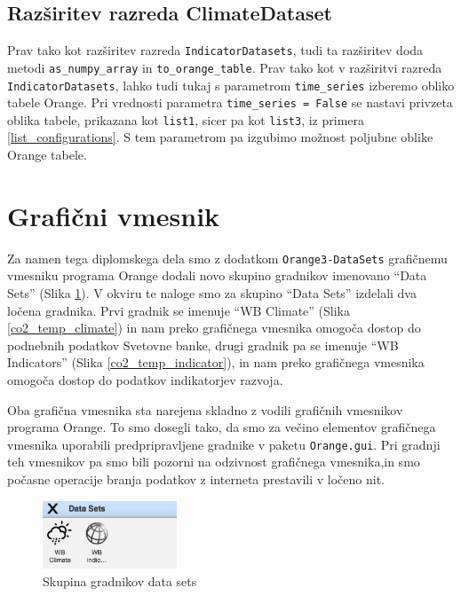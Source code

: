 \subsection{Razširitev razreda ClimateDataset}
\label{razsiritev_razreda_climatedataset}

Prav tako kot razširitev razreda \verb|IndicatorDatasets|, tudi ta razširitev
doda metodi \verb|as_numpy_array| in \verb|to_orange_table|. Prav tako kot v
razširitvi razreda \verb|IndicatorDatasets|, lahko tudi tukaj s parametrom
\verb|time_series| izberemo obliko tabele Orange. Pri vrednosti parametra 
\verb|time_series = False| se nastavi privzeta oblika tabele, prikazana kot
\verb|list1|, sicer pa kot \verb|list3|, iz primera \ref{list_configurations}.
S tem parametrom pa izgubimo možnost poljubne oblike Orange tabele.


\section{Grafični vmesnik}

Za namen tega diplomskega dela smo z dodatkom \verb|Orange3-DataSets|
grafičnemu vmesniku programa Orange dodali novo skupino gradnikov imenovano
``Data Sets'' (Slika \ref{data_sets_group}). V okviru te naloge smo za skupino
``Data Sets'' izdelali dva ločena gradnika. Prvi gradnik se imenuje ``WB
Climate'' (Slika \ref{co2_temp_climate}) in nam preko grafičnega vmesnika 
omogoča dostop do podnebnih podatkov Svetovne banke, drugi gradnik pa se 
imenuje ``WB Indicators'' (Slika \ref{co2_temp_indicator}), in nam
preko grafičnega vmesnika omogoča dostop do podatkov indikatorjev razvoja.

Oba grafična vmesnika sta narejena skladno z vodili grafičnih vmesnikov
programa Orange. To smo dosegli tako, da smo za večino elementov grafičnega
vmesnika uporabili predpripravljene gradnike v paketu \verb|Orange.gui|. Pri
gradnji teh vmesnikov pa smo bili pozorni na odzivnost grafičnega vmesnika,in
smo počasne operacije branja podatkov z interneta prestavili v ločeno nit.
 
\begin{figure}
  \begin{center}
    \includegraphics[width=4cm]{pic/data_sets_group.png}
  \end{center}
  \caption{Skupina gradnikov data sets}
  \label{data_sets_group}
\end{figure} 


